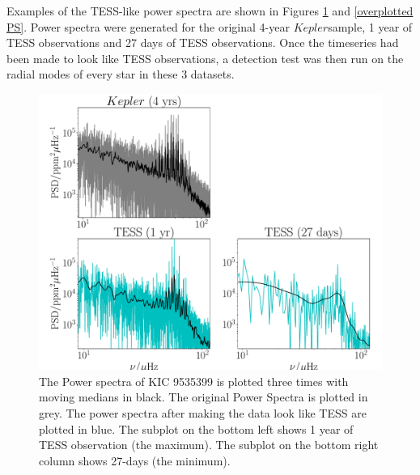 \documentclass[a4paper,fleqn,usenatbib,useAMS]{mnras}
\newcommand{\kep}{\ensuremath{Kepler}\:}
\begin{document}
Examples of the TESS-like power spectra are shown in Figures \ref{Power Spectra} and \ref{overplotted PS}. Power spectra were generated for the original 4-year \kep sample, 1 year of TESS observations and 27 days of TESS observations. Once the timeseries had been made to look like TESS observations, a detection test was then run on the radial modes of every star in these 3 datasets. 

\begin{figure}
	\centering
	\includegraphics[scale=0.3]{diagnostic_plot3_modes}
	\caption{The Power spectra of KIC 9535399 is plotted three times with moving medians in black. The original Power Spectra is plotted in grey. The power spectra after making the data look like TESS are plotted in blue. The subplot on the bottom left shows 1 year of TESS observation (the maximum). The subplot on the bottom right column shows 27-days (the minimum).}	
	\label{Power Spectra}
\end{figure} 
\end{document}
